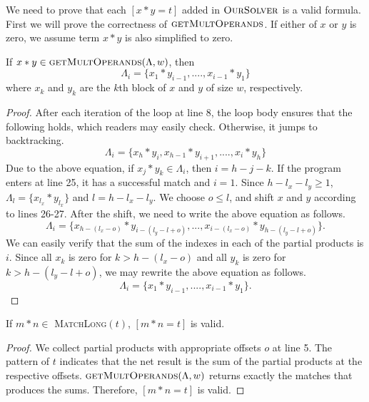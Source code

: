 We need to prove that each $[x*y = t]$ added in $\textsc{OurSolver}$
is a valid formula.
%
First we will prove the correctness of $\textsc{getMultOperands}$.
%
If either of $x$ or $y$ is zero, we assume term $x*y$ is also simplified to zero.
\begin{thm}
 If $ x*y \in \textsc{getMultOperands}(\Lambda,w)$, then
 $$
 \Lambda_i = \{ x_1*y_{i-1},....,x_{i-1}*y_1 \}
 $$
  where $x_k$ and $y_k$ are the $k$th block of $x$ and $y$ of size
$w$, respectively.
\end{thm}
\begin{proof}
  After each iteration of the loop at line 8,
  the loop body ensures that the following holds, which readers 
  may easily check.
  Otherwise, it jumps to backtracking.
  $$
  \Lambda_i = \{ x_h*y_{i}, x_{h-1}*y_{i+1},....,x_{i}*y_h \}
  $$
  Due to the above equation,
  if $x_j*y_k \in \Lambda_i$, then $ i = h-j-k$.
  If the program enters at line 25, it has a successful match and $i=1$.
  Since $h-l_x -l_y \geq 1$, $\Lambda_l = \{x_{l_x}*y_{l_x}\}$
  and $l = h - l_x - l_y$.
  We choose $o \leq l$, and shift $x$ and $y$ according to lines 26-27.
  After the shift, we need to write the above equation as follows.
  $$
  \Lambda_i = \{ x_{h-(l_x-o)}*y_{i-(l_y-l+o)},...,x_{i-(l_x-o)}*y_{h-(l_y-l+o)} \}.
  $$
  We can easily verify that the sum of the indexes in each of
  the partial products is $i$.
  Since all $x_k$ is zero for $k > h-(l_x-o)$ and all $y_k$ is zero
  for $k > h-(l_y-l+o)$,
  we may rewrite the above equation as follows.
  $$
  \Lambda_i = \{ x_1*y_{i-1},....,x_{i-1}*y_1 \}.
  $$
\end{proof}

\begin{thm}
  If $m*n\in$ \textsc{MatchLong}$(t)$, $[m*n = t]$ is valid.
\end{thm}
\begin{proof}
  We collect partial products with appropriate offsets $o$ at line 5.
  The pattern of $t$ indicates that the net result is the sum of the 
  partial products at the respective offsets. 
  $\textsc{getMultOperands}(\Lambda,w)$ returns exactly the
  matches that produces the sums.
  Therefore, $[m*n = t]$ is valid.
\end{proof}

